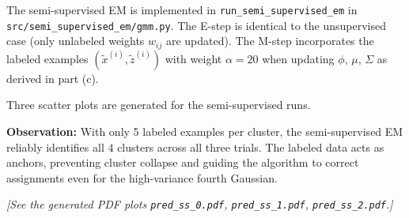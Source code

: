 \begin{answer}
The semi-supervised EM is implemented in \texttt{run\_semi\_supervised\_em} in \texttt{src/semi\_supervised\_em/gmm.py}. The E-step is identical to the unsupervised case (only unlabeled weights $w_{ij}$ are updated). The M-step incorporates the labeled examples $(\tilde{x}^{(i)}, \tilde{z}^{(i)})$ with weight $\alpha = 20$ when updating $\phi$, $\mu$, $\Sigma$ as derived in part (c).

Three scatter plots are generated for the semi-supervised runs.

\textbf{Observation:} With only 5 labeled examples per cluster, the semi-supervised EM reliably identifies all 4 clusters across all three trials. The labeled data acts as anchors, preventing cluster collapse and guiding the algorithm to correct assignments even for the high-variance fourth Gaussian.

\textit{[See the generated PDF plots \texttt{pred\_ss\_0.pdf}, \texttt{pred\_ss\_1.pdf}, \texttt{pred\_ss\_2.pdf}.]}
\end{answer}
